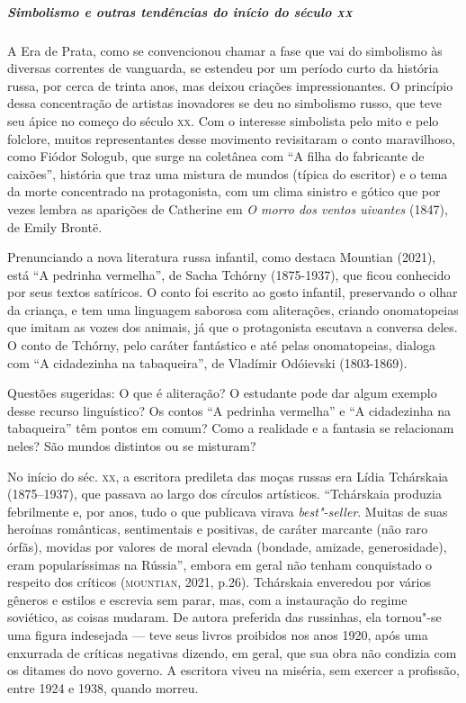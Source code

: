 \documentclass[11pt]{extarticle}
\begin{document}
\subparagraph{Simbolismo e outras tendências do início do século \textsc{xx}}


A Era de Prata, como se convencionou chamar a fase que vai do
simbolismo às diversas correntes de vanguarda, se estendeu por um
período curto da história russa, por cerca de trinta anos, mas deixou
criações impressionantes. O princípio dessa concentração de artistas
inovadores se deu no simbolismo russo, que teve seu ápice no começo do
século \textsc{xx}. Com o interesse simbolista pelo mito e pelo folclore, muitos
representantes desse movimento revisitaram o conto maravilhoso, como
Fiódor Sologub, que surge na coletânea com ``A filha do fabricante de
caixões'', história que traz uma mistura de mundos (típica do
escritor) e o tema da morte concentrado na protagonista, com um clima
sinistro e gótico que por vezes lembra as aparições de Catherine em
\emph{O morro dos ventos uivantes} (1847), de Emily Brontë.

Prenunciando a nova literatura russa infantil, como destaca Mountian
(2021), está ``A pedrinha vermelha'', de Sacha Tchórny (1875-1937), que
ficou conhecido por seus textos satíricos. O conto foi escrito ao gosto
infantil, preservando o olhar da criança, e tem uma linguagem saborosa
com aliterações, criando onomatopeias que imitam as vozes dos animais, já
que o protagonista escutava a conversa deles. O conto de Tchórny, pelo
caráter fantástico e até pelas onomatopeias, dialoga com ``A cidadezinha
na tabaqueira'', de Vladímir Odóievski (1803-1869).




Questões sugeridas: O que é aliteração? O estudante pode dar algum
exemplo desse recurso linguístico? Os contos ``A pedrinha vermelha'' e
``A cidadezinha na tabaqueira'' têm pontos em comum? Como a realidade e
a fantasia se relacionam neles? São mundos distintos ou se misturam?

No início do séc. \textsc{xx}, a escritora predileta das moças russas era Lídia
Tchárskaia (1875--1937), que passava ao largo dos círculos artísticos.
``Tchárskaia produzia febrilmente e, por anos, tudo o que publicava
virava \emph{best"-seller}. Muitas de suas heroínas românticas,
sentimentais e positivas, de caráter marcante (não raro órfãs), movidas
por valores de moral elevada (bondade, amizade, generosidade), eram
popularíssimas na Rússia'', embora em geral não tenham conquistado o
respeito dos críticos (\textsc{mountian}, 2021, p.26). Tchárskaia enveredou por
vários gêneros e estilos e escrevia sem parar, mas, com a instauração do
regime soviético, as coisas mudaram. De autora preferida das russinhas,
ela tornou"-se uma figura indesejada --- teve seus livros proibidos nos
anos 1920, após uma enxurrada de críticas negativas dizendo, em geral,
que sua obra não condizia com os ditames do novo governo. A escritora
viveu na miséria, sem exercer a profissão, entre 1924 e 1938, quando
morreu.
\end{document}
